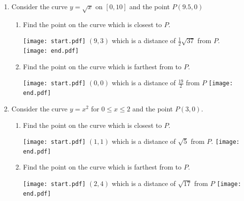 \documentclass[12pt]{article}
\begin{document}
\begin{enumerate}
\begin{enumerate}
\end{enumerate}

\item Consider the curve $y=\sqrt{x}$ on $[0,10]$ and the point $P(9.5,0)$

\begin{enumerate}

\item Find the point on the curve which is closest to $P$.

\texttt{[image: start.pdf]}
{{$(9,3)$ which is a distance of $\frac{1}{2}\sqrt{37}$ from $P$.}}
\texttt{[image: end.pdf]}


\item Find the point on the curve which is farthest from to $P$.

\texttt{[image: start.pdf]}
{{$(0,0)$ which is a distance of $\frac{19}{2}$ from $P$}}
\texttt{[image: end.pdf]}


\end{enumerate}

\item Consider the curve $y=x^2$ for $0\leq x \leq 2$ and the point $P(3,0)$.

\begin{enumerate}

\item Find the point on the curve which is closest to $P$.

\texttt{[image: start.pdf]}
{{$(1,1)$ which is a distance of $\sqrt{5}$ from $P$.}}
\texttt{[image: end.pdf]}


\item Find the point on the curve which is farthest from to $P$.

\texttt{[image: start.pdf]}
{{$(2,4)$ which is a distance of $\sqrt{17}$ from $P$}}
\texttt{[image: end.pdf]}


\end{enumerate}

\end{enumerate}
\end{document}
